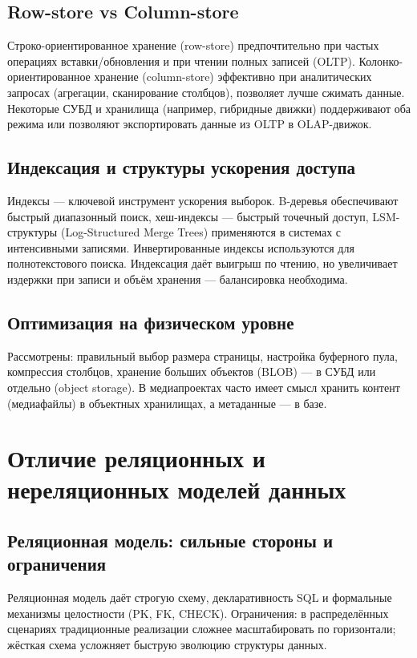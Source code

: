 \documentclass[14pt,a4paper]{extarticle}
\begin{document}
\subsection{Row-store vs Column-store}
Строко-ориентированное хранение (row-store) предпочтительно при частых операциях вставки/обновления и при чтении полных записей (OLTP). Колонко-ориентированное хранение (column-store) эффективно при аналитических запросах (агрегации, сканирование столбцов), позволяет лучше сжимать данные. Некоторые СУБД и хранилища (например, гибридные движки) поддерживают оба режима или позволяют экспортировать данные из OLTP в OLAP-движок.

\subsection{Индексация и структуры ускорения доступа}
Индексы — ключевой инструмент ускорения выборок. B-деревья обеспечивают быстрый диапазонный поиск, хеш-индексы — быстрый точечный доступ, LSM-структуры (Log-Structured Merge Trees) применяются в системах с интенсивными записями. Инвертированные индексы используются для полнотекстового поиска. Индексация даёт выигрыш по чтению, но увеличивает издержки при записи и объём хранения — балансировка необходима.

\subsection{Оптимизация на физическом уровне}
Рассмотрены: правильный выбор размера страницы, настройка буферного пула, компрессия столбцов, хранение больших объектов (BLOB) — в СУБД или отдельно (object storage). В медиапроектах часто имеет смысл хранить контент (медиафайлы) в объектных хранилищах, а метаданные — в базе.

\section{Отличие реляционных и нереляционных моделей данных}
\subsection{Реляционная модель: сильные стороны и ограничения}
Реляционная модель даёт строгую схему, декларативность SQL и формальные механизмы целостности (PK, FK, CHECK). Ограничения: в распределённых сценариях традиционные реализации сложнее масштабировать по горизонтали; жёсткая схема усложняет быструю эволюцию структуры данных.
\end{document}
